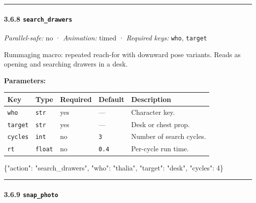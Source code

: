 \documentclass[
  11pt,
]{book}
\newenvironment{Shaded}{}{}
\newcommand{\DataTypeTok}[1]{\textcolor[rgb]{0.56,0.13,0.00}{#1}}
\newcommand{\DecValTok}[1]{\textcolor[rgb]{0.25,0.63,0.44}{#1}}
\newcommand{\FunctionTok}[1]{\textcolor[rgb]{0.02,0.16,0.49}{#1}}
\newcommand{\StringTok}[1]{\textcolor[rgb]{0.25,0.44,0.63}{#1}}
\begin{document}
\begin{center}\rule{0.5\linewidth}{0.5pt}\end{center}

\paragraph{\texorpdfstring{3.6.8
\texttt{search\_drawers}}{3.6.8 search\_drawers}}\label{search_drawers}

\emph{Parallel-safe:} no · \emph{Animation:} timed · \emph{Required
keys:} \texttt{who}, \texttt{target}

Rummaging macro: repeated reach-for with downward pose variants. Reads
as opening and searching drawers in a desk.

\textbf{Parameters:}

\begin{longtable}[]{@{}lllll@{}}
\toprule\noalign{}
Key & Type & Required & Default & Description \\
\midrule\noalign{}
\endhead
\bottomrule\noalign{}
\endlastfoot
\texttt{who} & \texttt{str} & yes & --- & Character key. \\
\texttt{target} & \texttt{str} & yes & --- & Desk or chest prop. \\
\texttt{cycles} & \texttt{int} & no & \texttt{3} & Number of search
cycles. \\
\texttt{rt} & \texttt{float} & no & \texttt{0.4} & Per-cycle run
time. \\
\end{longtable}

\begin{Shaded}
\begin{Highlighting}[]
\FunctionTok{\{}\DataTypeTok{"action"}\FunctionTok{:} \StringTok{"search\_drawers"}\FunctionTok{,} \DataTypeTok{"who"}\FunctionTok{:} \StringTok{"thalia"}\FunctionTok{,} \DataTypeTok{"target"}\FunctionTok{:} \StringTok{"desk"}\FunctionTok{,} \DataTypeTok{"cycles"}\FunctionTok{:} \DecValTok{4}\FunctionTok{\}}
\end{Highlighting}
\end{Shaded}

\begin{center}\rule{0.5\linewidth}{0.5pt}\end{center}

\paragraph{\texorpdfstring{3.6.9
\texttt{snap\_photo}}{3.6.9 snap\_photo}}\label{snap_photo}
\end{document}
